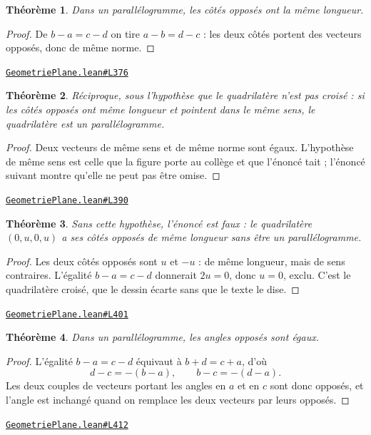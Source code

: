 \documentclass[11pt,a4paper]{article}
\theoremstyle{definition}
\theoremstyle{plain}
\newtheorem{theoreme}{Théorème}
\newcommand{\source}[2]{\par\smallskip\noindent\hfill{\footnotesize\href{#1}{\texttt{#2}}}\par\smallskip}
\begin{document}
\begin{theoreme}
Dans un parallélogramme, les côtés opposés ont la même longueur.
\end{theoreme}

\begin{proof}
De $b - a = c - d$ on tire $a - b = d - c$ : les deux côtés portent des vecteurs opposés,
donc de même norme.
\end{proof}
\source{https://github.com/Commutator-IO/learn-lean/blob/main/courses/01-college/02-geometrie-plane/GeometriePlane.lean\#L376}{GeometriePlane.lean\#L376}

\begin{theoreme}
Réciproque, sous l'hypothèse que le quadrilatère n'est pas croisé : si les côtés
opposés ont même longueur et pointent dans le même sens, le quadrilatère est un
parallélogramme.
\end{theoreme}

\begin{proof}
Deux vecteurs de même sens et de même norme sont égaux. L'hypothèse de même sens est
celle que la figure porte au collège et que l'énoncé tait ; l'énoncé suivant montre qu'elle
ne peut pas être omise.
\end{proof}
\source{https://github.com/Commutator-IO/learn-lean/blob/main/courses/01-college/02-geometrie-plane/GeometriePlane.lean\#L390}{GeometriePlane.lean\#L390}

\begin{theoreme}
Sans cette hypothèse, l'énoncé est faux : le quadrilatère $(0, u, 0, u)$ a ses côtés
opposés de même longueur sans être un parallélogramme.
\end{theoreme}

\begin{proof}
Les deux côtés opposés sont $u$ et $-u$ : de même longueur, mais de sens contraires.
L'égalité $b - a = c - d$ donnerait $2u = 0$, donc $u = 0$, exclu. C'est le quadrilatère
croisé, que le dessin écarte sans que le texte le dise.
\end{proof}
\source{https://github.com/Commutator-IO/learn-lean/blob/main/courses/01-college/02-geometrie-plane/GeometriePlane.lean\#L401}{GeometriePlane.lean\#L401}

\begin{theoreme}
Dans un parallélogramme, les angles opposés sont égaux.
\end{theoreme}

\begin{proof}
L'égalité $b - a = c - d$ équivaut à $b + d = c + a$, d'où
\[ d - c = -(b - a), \qquad b - c = -(d - a) . \]
Les deux couples de vecteurs portant les angles en $a$ et en $c$ sont donc opposés, et
l'angle est inchangé quand on remplace les deux vecteurs par leurs opposés.
\end{proof}
\source{https://github.com/Commutator-IO/learn-lean/blob/main/courses/01-college/02-geometrie-plane/GeometriePlane.lean\#L412}{GeometriePlane.lean\#L412}
\end{document}
